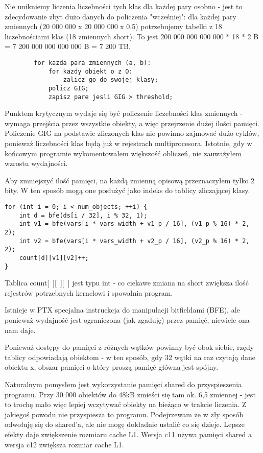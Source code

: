 \documentclass[a4paper]{article}
\begin{document}
    Nie unikniemy liczenia liczebności tych klas dla każdej pary osobno - jest to zdecydowanie zbyt dużo danych do policzenia "wcześniej": dla każdej pary zmiennych (20 000 000 x 20 000 000 x 0.5) potrzebujemy tabelki z 18 liczebnościami klas (18 zmiennych short). To jest 200 000 000 000 000 * 18 * 2 B = 7 200 000 000 000 000 B = 7 200 TB.

    \begin{lstlisting}
        for kazda para zmiennych (a, b):
            for kazdy obiekt o z O:
                zalicz go do swojej klasy;
            policz GIG;
            zapisz pare jesli GIG > threshold;
    \end{lstlisting}

    Punktem krytycznym wydaje się być policzenie liczebności klas zmiennych - wymaga przejścia przez wszystkie obiekty, a więc przejrzenie dużej ilości pamięci. Policzenie GIG na podstawie zliczonych klas nie powinno zajmować dużo cyklów, ponieważ liczebności klas będą już w rejestrach multiprocesora. Istotnie, gdy w końcowym programie wykomentowałem większość obliczeń, nie zauważyłem wzrostu wydajności.

    Aby zmniejszyć ilość pamięci, na każdą zmienną opisową przeznaczyłem tylko 2 bity. W ten sposób mogą one posłużyć jako indeks do tablicy zliczającej klasy.

    \begin{lstlisting}
for (int i = 0; i < num_objects; ++i) {
    int d = bfe(ds[i / 32], i % 32, 1);
    int v1 = bfe(vars[i * vars_width + v1_p / 16], (v1_p % 16) * 2, 2);
    int v2 = bfe(vars[i * vars_width + v2_p / 16], (v2_p % 16) * 2, 2);
    count[d][v1][v2]++;
}
    \end{lstlisting}

    Tablica count[~][~][~] jest typu int - co ciekawe zmiana na short zwiększa ilość rejestrów potrzebnych kernelowi i spowalnia program.

    Istnieje w PTX specjalna instruckcja do manipulacji bitfieldami (BFE), ale ponieważ wydajność jest ograniczona (jak zgaduję) przez pamięć, niewiele ona nam daje.

    Ponieważ dostępy do pamięci z różnych wątków powinny być obok siebie, rzędy tablicy odpowiadają obiektom - w ten sposób, gdy 32 wątki na raz czytają dane obiektu x, obszar pamięci o który proszą pamięć główną jest spójny.

    Naturalnym pomysłem jest wykorzystanie pamięci shared do przyspieszenia programu. Przy 30 000 obiektów do 48kB zmieści się tam ok. 6,5 zmiennej - jest to trochę mało więc lepiej wczytywać obiekty na bieżąco w trakcie liczenia. Z jakiegoś powodu nie przyspiesza to programu. Podejrzewam że w zły sposób odwołuję się do shared'a, ale nie mogę dokładnie ustalić co się dzieje. Lepsze efekty daje zwiększenie rozmiaru cache L1. Wersja c11 używa pamięci shared a wersja c12 zwiększa rozmiar cache L1.
\end{document}
